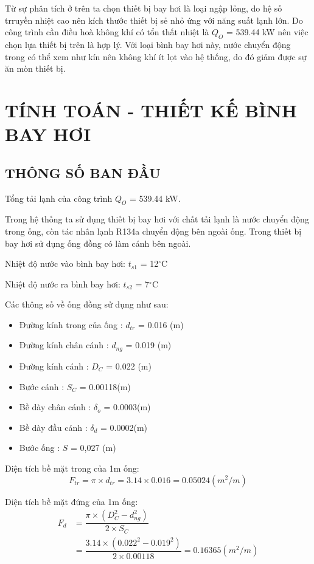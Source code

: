 Từ sự phân tích ở trên ta chọn thiết bị bay hơi là loại ngập lỏng, do hệ số trruyền nhiệt cao nên kích thước thiết bị sẻ nhỏ ứng với năng suất lạnh lớn. Do công trình cần điều hoà không khí có tổn thất nhiệt là $Q_{O}$ = 539.44 kW nên việc chọn lựa thiết bị trên là hợp lý. Với loại bình bay hơi này, nước chuyển động trong có thể xem như kín nên không khí ít lọt vào hệ thống, do đó giảm được sự ăn mòn thiết bị.

\section{TÍNH TOÁN - THIẾT KẾ BÌNH BAY HƠI}
\subsection{THÔNG SỐ BAN ĐẦU}
Tổng tải lạnh của công trình $Q_{O}$ = 539.44 kW.

Trong hệ thống ta sử dụng thiết bị bay hơi với chất tải lạnh là nước chuyển động trong ống, còn tác nhân lạnh R134a chuyển động bên ngoài ống. Trong thiết bị bay hơi sử dụng ống đồng có làm cánh bên ngoài.

Nhiệt độ nước vào bình bay hơi: $t_{s1}$ = 12$^{\circ}$C

Nhiệt độ nước ra bình bay hơi: $t_{s2}$ = 7$^{\circ}$C

Các thông số về ống đồng sử dụng như sau:
\begin{itemize}
	\item Đường kính trong của ống : $ d_{tr} $ = 0.016 (m)
	\item Đường kính chân cánh : $ d_{ng} $ = 0.019 (m)
	\item Đường kính cánh : $D_{C}$ = 0.022 (m)
	\item Bước cánh : $ S_{C} $ =  0.00118(m)
	\item Bề dày chân cánh : $ \delta_{o} $ = 0.0003(m) 
	\item Bề dày đầu cánh : $ \delta_{d} $ = 0.0002(m)
	\item Bước ống : $S$ = 0,027 (m)
\end{itemize}

Diện tích bề mặt trong của 1m ống:
\begin{equation*}
	F_{tr} = \pi\times d_{tr} = 3.14 \times 0.016 = 0.05024(m^2/m)
\end{equation*}

Diện tích bề mặt đứng của 1m ống:
\begin{equation*}
	\begin{split}
		F_{d} &= \dfrac{\pi\times(D_{C}^2 - d_{ng}^2)}{2\times S_{C}}\\
		&= \dfrac{3.14 \times (0.022^2 - 0.019^2)}{2 \times 0.00118}=0.16365(m^2/m)
	\end{split} 
\end{equation*}

